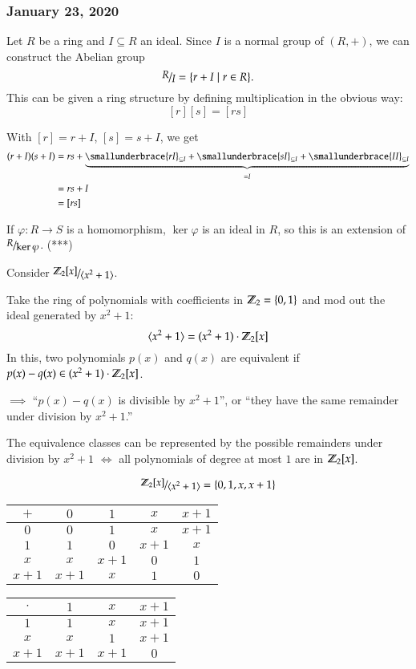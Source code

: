 \subsubsection*{January 23, 2020}

Let $R$ be a ring and $I\subseteq R$ an ideal. Since $I$ is a normal group of $(R, +)$, we can construct the Abelian group
\[\nicefrac{R}{I} = \{r+I\mid r\in R\}.\]
This can be given a ring structure by defining multiplication in the obvious way: 
\[[r][s] = [rs]\]

With $[r] = r+I$, $[s] = s+I$, we get
\begin{align*}
	(r+I)(s+I)&=rs+\underbrace{\smallunderbrace{rI}_{\subseteq I}+\smallunderbrace{sI}_{\subseteq I}+\smallunderbrace{II}_{\subseteq I}}_{=I} \\
	&= rs + I \\
	&= [rs]
\end{align*}

\example If $\varphi: R\to S$ is a homomorphism, $\ker \varphi$ is an ideal in $R$, so this is an extension of $\nicefrac{R}{\ker \varphi}$. (***)

Consider $\nicefrac{\Z_2[x]}{\langle x^2+1 \rangle}$. 

Take the ring of polynomials with coefficients in $\mathbb{Z}_2=\{0,1\}$ and mod out the ideal generated by $x^2 + 1$: 
\[\langle x^2 + 1 \rangle = (x^2+1)\cdot \mathbb{Z}_2[x]\]
In this, two polynomials $p(x)$ and $q(x)$ are equivalent if $p(x)-q(x)\in(x^2+1)\cdot \mathbb{Z}_2[x]$. 

$\implies$ ``$p(x) - q(x)$ is divisible by $x^2+1$'', or ``they have the same remainder under division by $x^2+1$.''

The equivalence classes can be represented by the possible remainders under division by $x^2+1$ $\iff$ all polynomials of degree at most $1$ are in $\mathbb{Z}_2[x]$. 

\[\nicefrac{\Z_2[x]}{\langle x^2+1 \rangle} = \{0, 1, x, x+1\}\]
\begin{center}
\begin{tabular}{c|cccc}
$+$   & $0$   & $1$   & $x$   & $x+1$ \\ \hline
$0$   & $0$   & $1$   & $x$   & $x+1$ \\
$1$   & $1$   & $0$   & $x+1$ & $x$   \\
$x$   & $x$   & $x+1$ & $0$   & $1$   \\
$x+1$ & $x+1$ & $x$   & $1$   & $0$  
\end{tabular}
\hspace{2em}
\begin{tabular}{c|ccc}
$\cdot$ & $1$   & $x$   & $x+1$ \\ \hline
$1$     & $1$   & $x$   & $x+1$ \\
$x$     & $x$   & $1$   & $x+1$ \\
$x+1$   & $x+1$ & $x+1$ & $0$  
\end{tabular}
\end{center}

